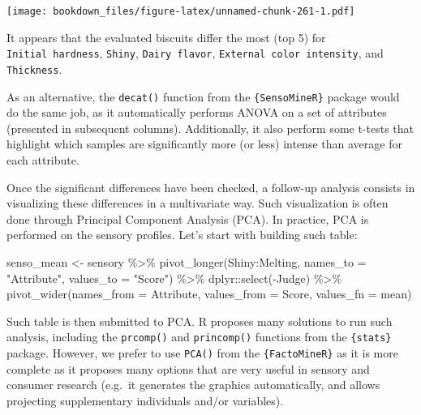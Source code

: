 \documentclass[
]{krantz}
\makeatletter
\newenvironment{Shaded}{\begin{snugshade}}{\end{snugshade}}
\newcommand{\AttributeTok}[1]{\textcolor[rgb]{0.61,0.61,0.61}{#1}}
\newcommand{\FunctionTok}[1]{\textcolor[rgb]{0,0,0}{#1}}
\newcommand{\NormalTok}[1]{#1}
\newcommand{\OtherTok}[1]{\textcolor[rgb]{0.37,0.37,0.37}{#1}}
\newcommand{\SpecialCharTok}[1]{\textcolor[rgb]{0,0,0}{#1}}
\newcommand{\StringTok}[1]{\textcolor[rgb]{0.5,0.5,0.5}{#1}}
\renewenvironment{quote}{\begin{VF}}{\end{VF}}
\newenvironment{kframe}{%
\medskip{}
\setlength{\fboxsep}{.8em}
 \def\at@end@of@kframe{}%
 \ifinner\ifhmode%
  \def\at@end@of@kframe{\end{minipage}}%
  \begin{minipage}{\columnwidth}%
 \fi\fi%
 \def\FrameCommand##1{\hskip\@totalleftmargin \hskip-\fboxsep
 \colorbox{shadecolor}{##1}\hskip-\fboxsep
     \hskip-\linewidth \hskip-\@totalleftmargin \hskip\columnwidth}%
 \MakeFramed {\advance\hsize-\width
   \@totalleftmargin\z@ \linewidth\hsize
   \@setminipage}}%
 {\par\unskip\endMakeFramed%
 \at@end@of@kframe}
\renewenvironment{Shaded}{\begin{kframe}}{\end{kframe}}
\makeatother
\begin{document}
\texttt{[image: bookdown\_files/figure-latex/unnamed-chunk-261-1.pdf]}

It appears that the evaluated biscuits differ the most (top 5) for \texttt{Initial\ hardness}, \texttt{Shiny}, \texttt{Dairy\ flavor}, \texttt{External\ color\ intensity}, and \texttt{Thickness}.

\begin{quote}
As an alternative, the \texttt{decat()} function from the \texttt{\{SensoMineR\}} package would do the same job, as it automatically performs ANOVA on a set of attributes (presented in subsequent columns). Additionally, it also perform some t-tests that highlight which samples are significantly more (or less) intense than average for each attribute.
\end{quote}

Once the significant differences have been checked, a follow-up analysis consists in visualizing these differences in a multivariate way. Such visualization is often done through Principal Component Analysis (PCA). In practice, PCA is performed on the sensory profiles. Let's start with building such table:

\begin{Shaded}
\begin{Highlighting}[]
\NormalTok{senso\_mean }\OtherTok{\textless{}{-}}\NormalTok{ sensory }\SpecialCharTok{\%\textgreater{}\%}
  \FunctionTok{pivot\_longer}\NormalTok{(Shiny}\SpecialCharTok{:}\NormalTok{Melting, }
               \AttributeTok{names\_to =} \StringTok{"Attribute"}\NormalTok{, }\AttributeTok{values\_to =} \StringTok{"Score"}\NormalTok{) }\SpecialCharTok{\%\textgreater{}\%}
\NormalTok{  dplyr}\SpecialCharTok{::}\FunctionTok{select}\NormalTok{(}\SpecialCharTok{{-}}\NormalTok{Judge) }\SpecialCharTok{\%\textgreater{}\%}
  \FunctionTok{pivot\_wider}\NormalTok{(}\AttributeTok{names\_from =}\NormalTok{ Attribute, }\AttributeTok{values\_from =}\NormalTok{ Score, }
              \AttributeTok{values\_fn =}\NormalTok{ mean)}
\end{Highlighting}
\end{Shaded}

Such table is then submitted to PCA. R proposes many solutions to run such analysis, including the \texttt{prcomp()} and \texttt{princomp()} functions from the \texttt{\{stats\}} package. However, we prefer to use \texttt{PCA()} from the \texttt{\{FactoMineR\}} as it is more complete as it proposes many options that are very useful in sensory and consumer research (e.g.~it generates the graphics automatically, and allows projecting supplementary individuals and/or variables).
\end{document}
